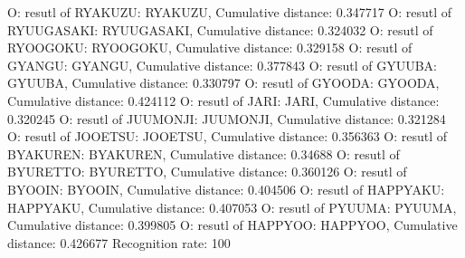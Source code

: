 O: resutl of RYAKUZU: RYAKUZU, Cumulative distance: 0.347717
O: resutl of RYUUGASAKI: RYUUGASAKI, Cumulative distance: 0.324032
O: resutl of RYOOGOKU: RYOOGOKU, Cumulative distance: 0.329158
O: resutl of GYANGU: GYANGU, Cumulative distance: 0.377843
O: resutl of GYUUBA: GYUUBA, Cumulative distance: 0.330797
O: resutl of GYOODA: GYOODA, Cumulative distance: 0.424112
O: resutl of JARI: JARI, Cumulative distance: 0.320245
O: resutl of JUUMONJI: JUUMONJI, Cumulative distance: 0.321284
O: resutl of JOOETSU: JOOETSU, Cumulative distance: 0.356363
O: resutl of BYAKUREN: BYAKUREN, Cumulative distance: 0.34688
O: resutl of BYURETTO: BYURETTO, Cumulative distance: 0.360126
O: resutl of BYOOIN: BYOOIN, Cumulative distance: 0.404506
O: resutl of HAPPYAKU: HAPPYAKU, Cumulative distance: 0.407053
O: resutl of PYUUMA: PYUUMA, Cumulative distance: 0.399805
O: resutl of HAPPYOO: HAPPYOO, Cumulative distance: 0.426677
Recognition rate: 100%
